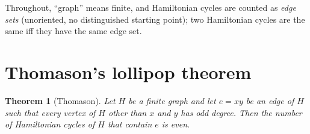 \documentclass{amsart}
\theoremstyle{plain}
\newtheorem{theorem}{Theorem}
\theoremstyle{definition}
\begin{document}
Throughout, ``graph'' means finite, and Hamiltonian cycles are counted as
\emph{edge sets} (unoriented, no distinguished starting point); two Hamiltonian
cycles are the same iff they have the same edge set.

\section{Thomason's lollipop theorem}

\begin{theorem}[Thomason]\label{thm:thomason}
Let $H$ be a finite graph and let $e=xy$ be an edge of $H$ such that every vertex
of $H$ other than $x$ and $y$ has odd degree.  Then the number of Hamiltonian
cycles of $H$ that contain $e$ is even.
\end{theorem}
\end{document}
